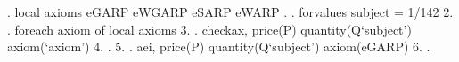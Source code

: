 . local axioms eGARP eWGARP eSARP eWARP
{\smallskip}
. 
. forvalues subject = 1/142 {\lbr}
  2.         
.         foreach axiom of local axioms {\lbr}
  3.         
.                 checkax, price(P) quantity(Q`subject') axiom(`axiom')
  4.                 
.         {\rbr}
  5. 
.         aei, price(P) quantity(Q`subject') axiom(eGARP)
  6. 
. {\rbr}

\oom
